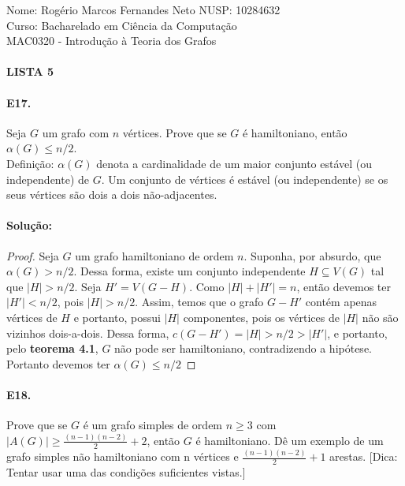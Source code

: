 \documentclass[11pt,a4paper,notitlepage]{exam}
\begin{document}
\begin{center}
  Nome: Rogério Marcos Fernandes Neto\hphantom{xxx} NUSP: 10284632\\
  Curso: Bacharelado em Ciência da Computação\\
  MAC0320 - Introdução à Teoria dos Grafos
  \paragraph{}
  \textbf{LISTA 5}
\end{center}
\paragraph{E17.}Seja $G$ um grafo com $n$ vértices. Prove que se $G$ é hamiltoniano, então $\alpha(G) \leq n/2$.\medskip\\
Definição: $\alpha(G)$ denota a cardinalidade de um maior conjunto estável (ou independente)
de $G$. Um conjunto de vértices é estável (ou independente) se os seus vértices são dois a dois
não-adjacentes.

\paragraph{Solução:}
\begin{proof}
  Seja $G$ um grafo hamiltoniano de ordem $n$. Suponha, por absurdo, que $\alpha(G) > n/2$. Dessa forma, existe um conjunto independente $H \subseteq V(G)$ tal que $|H| > n/2$. Seja $H' = V(G-H)$. Como $|H| + |H'| = n$, então devemos ter $|H'| < n/2$, pois $|H| > n/2$. Assim, temos que o grafo $G-H'$ contém apenas vértices de $H$ e portanto, possui $|H|$ componentes, pois os vértices de $|H|$ não são vizinhos dois-a-dois. Dessa forma, $c(G-H') = |H| > n/2 > |H'|$, e portanto, pelo \textbf{teorema 4.1}, $G$ não pode ser hamiltoniano, contradizendo a hipótese. Portanto devemos ter $\alpha(G) \leq n/2$
\end{proof}

\paragraph{E18.}Prove que se $G$ é um grafo simples de ordem $n \geq 3$ com $|A(G)| \geq \frac{(n-1)(n-2)}{2}
  + 2$, então $G$ é hamiltoniano. Dê um exemplo de um grafo simples não hamiltoniano com n vértices e $\frac{(n-1)(n-2)}{2} + 1$ arestas. [Dica: Tentar usar uma das condições suficientes vistas.]
\end{document}
